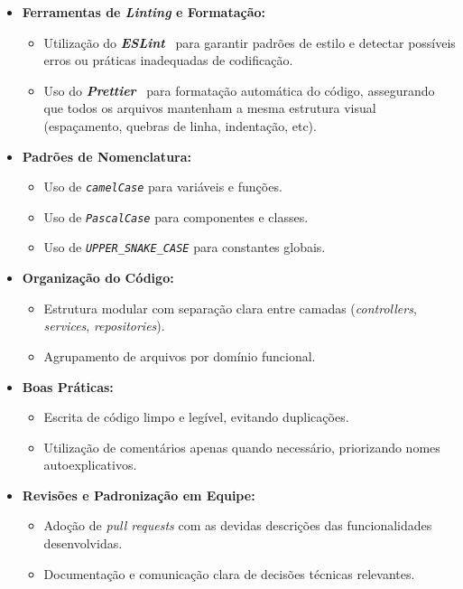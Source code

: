 \begin{itemize}
  \item \textbf{Ferramentas de \textit{Linting} e Formatação:}
  \begin{itemize}
    \item Utilização do \textbf{\textit{ESLint}}~\cite{eslint-2025} para garantir padrões de estilo e detectar possíveis erros ou práticas inadequadas de codificação.
    \item Uso do \textbf{\textit{Prettier}}~\cite{prettier-2025} para formatação automática do código, assegurando que todos os arquivos mantenham a mesma estrutura visual (espaçamento, quebras de linha, indentação, etc).
  \end{itemize}

  \item \textbf{Padrões de Nomenclatura:}
  \begin{itemize}
    \item Uso de \textit{\texttt{camelCase}} para variáveis e funções.
    \item Uso de \textit{\texttt{PascalCase}} para componentes e classes.
    \item Uso de \textit{\texttt{UPPER\_SNAKE\_CASE}} para constantes globais.
  \end{itemize}

  \item \textbf{Organização do Código:}
  \begin{itemize}
    \item Estrutura modular com separação clara entre camadas (\textit{controllers}, \textit{services}, \textit{repositories}).
    \item Agrupamento de arquivos por domínio funcional.
  \end{itemize}

  \item \textbf{Boas Práticas:}
  \begin{itemize}
    \item Escrita de código limpo e legível, evitando duplicações.
    \item Utilização de comentários apenas quando necessário, priorizando nomes autoexplicativos.
  \end{itemize}

  \item \textbf{Revisões e Padronização em Equipe:}
  \begin{itemize}
    \item Adoção de \textit{pull requests} com as devidas descrições das funcionalidades desenvolvidas.
    \item Documentação e comunicação clara de decisões técnicas relevantes.
  \end{itemize}
\end{itemize}

